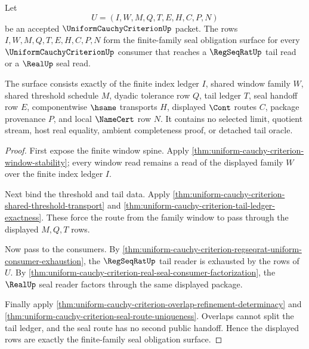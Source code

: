 \begin{theorem}
\label{thm:uniform-cauchy-criterion-finite-family-seal-obligation-package}
Let
$$
U=(I,W,M,Q,T,E,H,C,P,N)
$$
be an accepted $\UniformCauchyCriterionUp$ packet. The rows $I,W,M,Q,T,E,H,C,P,N$ form the finite-family seal obligation surface for every $\UniformCauchyCriterionUp$ consumer that reaches a $\RegSeqRatUp$ tail read or a $\RealUp$ seal read.

The surface consists exactly of the finite index ledger $I$, shared window family $W$, shared threshold schedule $M$, dyadic tolerance row $Q$, tail ledger $T$, seal handoff row $E$, componentwise $\hsame$ transports $H$, displayed $\Cont$ routes $C$, package provenance $P$, and local $\NameCert$ row $N$. It contains no selected limit, quotient stream, host real equality, ambient completeness proof, or detached tail oracle.
\end{theorem}
\begin{proof}
First expose the finite window spine. Apply \autoref{thm:uniform-cauchy-criterion-window-stability}; every window read remains a read of the displayed family $W$ over the finite index ledger $I$.

Next bind the threshold and tail data. Apply \autoref{thm:uniform-cauchy-criterion-shared-threshold-transport} and \autoref{thm:uniform-cauchy-criterion-tail-ledger-exactness}. These force the route from the family window to pass through the displayed $M,Q,T$ rows.

Now pass to the consumers. By \autoref{thm:uniform-cauchy-criterion-regseqrat-uniform-consumer-exhaustion}, the $\RegSeqRatUp$ tail reader is exhausted by the rows of $U$. By \autoref{thm:uniform-cauchy-criterion-real-seal-consumer-factorization}, the $\RealUp$ seal reader factors through the same displayed package.

Finally apply \autoref{thm:uniform-cauchy-criterion-overlap-refinement-determinacy} and \autoref{thm:uniform-cauchy-criterion-seal-route-uniqueness}. Overlaps cannot split the tail ledger, and the seal route has no second public handoff. Hence the displayed rows are exactly the finite-family seal obligation surface.
\end{proof}

